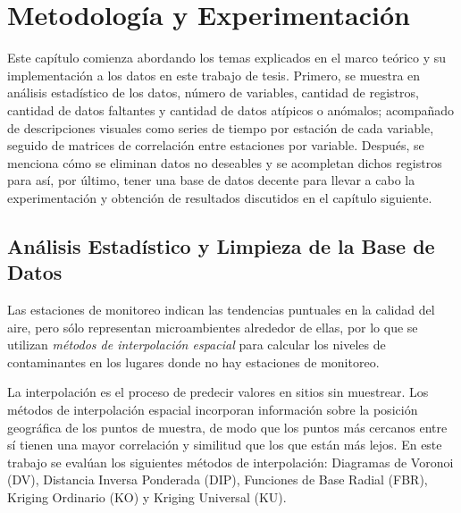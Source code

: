 \chapter{Metodología y Experimentación}

Este capítulo comienza abordando los temas explicados en el marco teórico y su implementación a los datos en este trabajo de tesis. Primero, se muestra en análisis estadístico de los datos, número de variables, cantidad de registros, cantidad de datos faltantes y cantidad de datos atípicos o anómalos; acompañado de descripciones visuales como series de tiempo por estación de cada variable, seguido de matrices de correlación entre estaciones por variable. Después, se menciona cómo se eliminan datos no deseables y se acompletan dichos registros para así, por último, tener una base de datos decente para llevar a cabo la experimentación y obtención de resultados discutidos en el capítulo siguiente.



\section{Análisis Estadístico y Limpieza de la Base de Datos}

Las estaciones de monitoreo indican las tendencias puntuales en la calidad del aire, pero sólo representan microambientes alrededor de ellas, por lo que se utilizan {\em métodos de interpolación espacial} para calcular los niveles de contaminantes en los lugares donde no hay estaciones de monitoreo.

La interpolación es el proceso de predecir valores en sitios sin muestrear. Los métodos de interpolación espacial incorporan información sobre la posición geográfica de los puntos de muestra, de modo que los puntos más cercanos entre sí tienen una mayor correlación y similitud que los que están más lejos. En este trabajo se evalúan los siguientes métodos de interpolación: Diagramas de Voronoi (DV), Distancia Inversa Ponderada (DIP), Funciones de Base Radial (FBR), Kriging Ordinario (KO) y Kriging Universal (KU).

